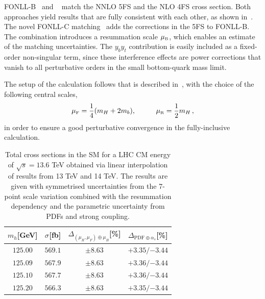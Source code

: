 \documentclass[11pt,a4paper]{article}
\begin{document}
FONLL-B~\cite{forte:2015hba,forte:2016sja} and \nlonnllpart{}~\cite{Bonvini:2015pxa,Bonvini:2016fgf} match the NNLO 5FS and the NLO 4FS cross section.
Both approaches yield results that are fully consistent with each other, as shown in~. 
The novel FONLL-C matching~\cite{Duhr:2020kzd} adds the \fnnnlo{} corrections in the 5FS to FONLL-B. The \nlonnllpart{} combination introduces a resummation scale $\muB$, which enables an estimate of the 
matching uncertainties.
The $y_by_t$  contribution is easily included as a fixed-order non-singular term, since these interference effects are power corrections that 
vanish to all perturbative orders in the small bottom-quark mass limit.

The setup of the calculation follows that is described in~, with the choice of the following central scales,
\begin{align}
\muF=\frac{1}{4}(m_H+2m_b),\hspace{1cm}\muR=\frac{1}{2}m_H\,,
\end{align}
in order to ensure a good perturbative convergence in the fully-inclusive calculation.

\begin{table}[t]
\begin{center}%
\begin{small}%
\begin{tabular}{|c|c|c|c|}%
\hline
$m_h$[GeV] & $\sigma^{}$[fb] & $\Delta_{\left(\mu_{R},\mu_{F}\right)\oplus\mu_{B}}$[\%] & $\Delta_{\mathrm{PDF}\oplus\alpha_s}$[\%]  \\\hline\hline
$125.00$ & $569.1$ & $\pm8.63$ & ${{+3.35}}/{-3.44}$ \\\hline
$125.09$ & $567.9$ & $\pm8.63$ & ${{+3.36}}/{-3.44}$ \\\hline
$125.10$ & $567.7$ & $\pm8.63$ & ${{+3.36}}/{-3.44}$ \\\hline
$125.20$ & $566.3$ & $\pm8.63$ & ${{+3.35}}/{-3.44}$ \\\hline
\end{tabular}%
\end{small}%
\end{center}%
\caption{Total \bbH{} cross sections in the SM for a LHC CM energy of $\sqrt{s}=13.6$ TeV obtained via linear interpolation of results from 13 TeV and 14 TeV. The results are given with symmetrised uncertainties from the 7-point scale variation combined with the resummation dependency and the parametric uncertainty from PDFs and strong coupling.}
\label{tab:bbH136lin}
\end{table}
\end{document}
